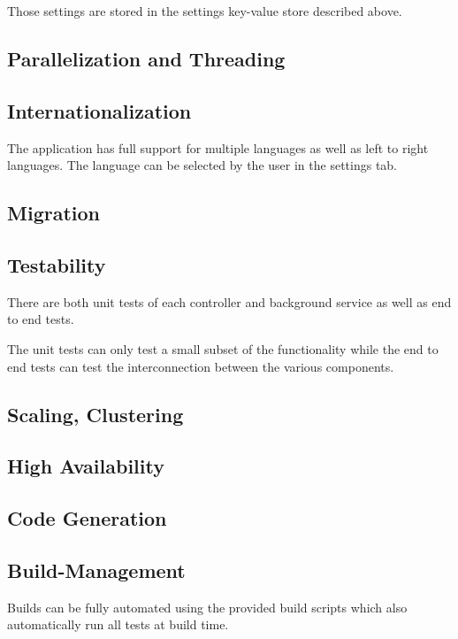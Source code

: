 \documentclass[]{article}
\begin{document}
Those settings are stored in the settings key-value store described above.

\subsection{Parallelization and Threading}

\subsection{Internationalization}

The application has full support for multiple languages as well as left to right languages. The language can be selected by the user in the settings tab.

\subsection{Migration}

\subsection{Testability}

There are both unit tests of each controller and background service as well as end to end tests. 

The unit tests can only test a small subset of the functionality while the end to end tests can test the interconnection between the various components.

\subsection{Scaling, Clustering}

\subsection{High Availability}

\subsection{Code Generation}

\subsection{Build-Management}

Builds can be fully automated using the provided build scripts which also automatically run all tests at build time. 
\end{document}
